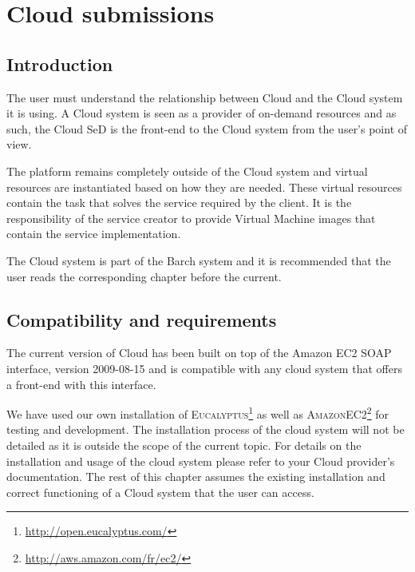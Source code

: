 

\chapter{Cloud submissions}\label{chapter:cloudSubmission}
\section{Introduction}

The user must understand the relationship between \diet Cloud and the Cloud system it is using.
A Cloud system is seen as a provider of on-demand resources and as such, the \diet Cloud SeD
is the front-end to the Cloud system from the \diet user's point of view.

The \diet platform remains completely outside of the Cloud system and virtual resources are
instantiated based on how they are needed. These virtual resources contain the task that solves
the service required by the \diet client. It is the responsibility of the \diet service
creator to provide Virtual Machine images that contain the service implementation. 

The \diet Cloud system is part of the \diet Barch system and it is recommended that the user
reads the corresponding chapter before the current.

\section{Compatibility and requirements}

The current version of \diet Cloud has been built on top of the Amazon EC2 SOAP interface,
version 2009-08-15 and is compatible with any cloud system that offers a front-end with
this interface.

We have used our own installation of
\textsc{Eucalyptus}\footnote{\url{http://open.eucalyptus.com/}}  as
well as
\textsc{AmazonEC2}\footnote{\url{http://aws.amazon.com/fr/ec2/}} for
testing and development. The installation process of the cloud system
will not be detailed as it is outside the scope of the current
topic. For details on the installation and usage of the cloud system
please refer to your Cloud provider's documentation. The rest of this
chapter assumes the existing installation and correct functioning of a
Cloud system that the user can access.

